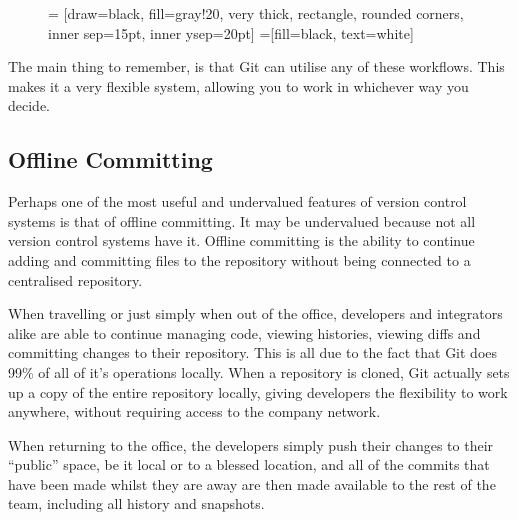 \begin{figure}[hbt]
 = [draw=black, fill=gray!20, very thick, rectangle, rounded corners, inner sep=15pt, inner ysep=20pt]
 =[fill=black, text=white]
\end{figure}

The main thing to remember, is that Git can utilise any of these workflows.  This makes it a very flexible system, allowing you to work in whichever way you decide.

\subsection{Offline Committing}

Perhaps one of the most useful and undervalued features of version control systems is that of offline committing.  It may be undervalued because not all version control systems have it.  Offline committing is the ability to continue adding and committing files to the repository without being connected to a centralised repository.  

When travelling or just simply when out of the office, developers and integrators alike are able to continue managing code, viewing histories, viewing diffs and committing changes to their repository.  This is all due to the fact that Git does 99\% of all of it's operations locally.  When a repository is cloned, Git actually sets up a copy of the entire repository locally, giving developers the flexibility to work anywhere, without requiring access to the company network.

When returning to the office, the developers simply push their changes to their ``public'' space, be it local or to a blessed location, and all of the commits that have been made whilst they are away are then made available to the rest of the team, including all history and snapshots.

